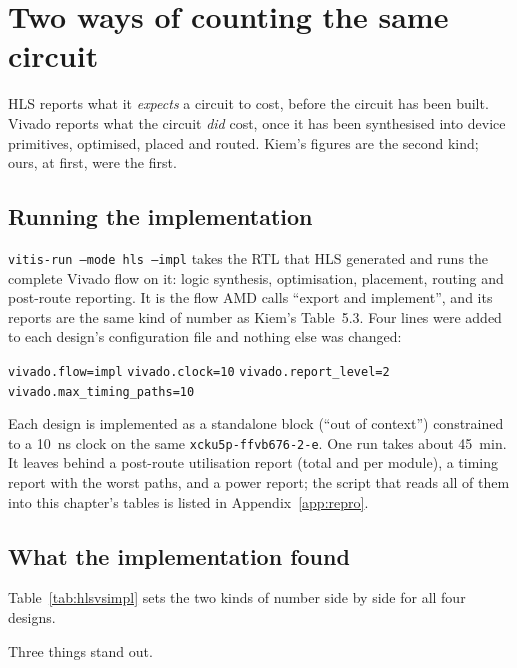 \section{Two ways of counting the same circuit}
\label{sec:hlsvsimpl}

HLS reports what it \emph{expects} a circuit to cost, before the circuit has
been built. Vivado reports what the circuit \emph{did} cost, once it has been
synthesised into device primitives, optimised, placed and routed. Kiem's
figures are the second kind; ours, at first, were the first.

\subsection{Running the implementation}

\texttt{vitis-run --mode hls --impl} takes the RTL that HLS generated and runs
the complete Vivado flow on it: logic synthesis, optimisation, placement,
routing and post-route reporting. It is the flow AMD calls ``export and
implement'', and its reports are the same kind of number as Kiem's Table~5.3.
Four lines were added to each design's configuration file and nothing else was
changed:
\begin{center}
\small
\texttt{vivado.flow=impl}\qquad
\texttt{vivado.clock=10}\qquad
\texttt{vivado.report\_level=2}\qquad
\texttt{vivado.max\_timing\_paths=10}
\end{center}
Each design is implemented as a standalone block (``out of context'')
constrained to a \SI{10}{\nano\second} clock on the same
\texttt{xcku5p-ffvb676-2-e}. One run takes about \SI{45}{\minute}. It leaves
behind a post-route utilisation report (total and per module), a timing report
with the worst paths, and a power report; the script that reads all of them
into this chapter's tables is listed in Appendix~\ref{app:repro}.

\subsection{What the implementation found}

Table~\ref{tab:hlsvsimpl} sets the two kinds of number side by side for all four
designs.



Three things stand out.

